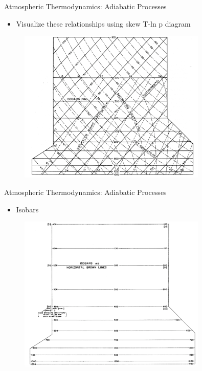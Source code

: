 \begin{frame}{Atmospheric Thermodynamics: Adiabatic Processes}

\begin{itemize}
	\item Visualize these relationships using skew T-ln p diagram
\end{itemize}
\begin{figure}
	\includegraphics[width=0.8\textwidth]{fig3}
\end{figure}
\end{frame}


\begin{frame}{Atmospheric Thermodynamics: Adiabatic Processes}

\begin{itemize}
	\item Isobars
\end{itemize}
\begin{figure}
	\includegraphics[width=0.8\textwidth]{fig4}
\end{figure}
\end{frame}

